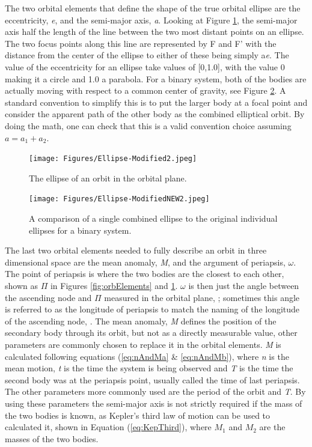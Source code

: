 \documentclass[12pt,preprint]{aastex}
\begin{document}
The two orbital elements that define the shape of the true orbital ellipse are the eccentricity, {\it e}, and the semi-major axis, {\it a}.  Looking at Figure \ref{fig:orbEllipse}, the semi-major axis half the length of the line between the two most distant points on an ellipse.  The two focus points along this line are represented by F and F' with the distance from the center of the ellipse to either of these being simply a{\it e}.  The value of the eccentricity for an ellipse take values of [0,1.0], with the value 0 making it a circle and 1.0 a parabola.  For a binary system, both of the bodies are actually moving with respect to a common center of gravity, see Figure \ref{fig:ellipseComparison}.  A standard convention to simplify this is to put the larger body at a focal point and consider the apparent path of the other body as the combined elliptical orbit.  By doing the math, one can check that this is a valid convention choice assuming  $a= a_1+ a_2$.  


\begin{figure}[h]
\begin{center}
\texttt{[image: Figures/Ellipse-Modified2.jpeg]}
\caption[Orbital Ellipse]{ The ellipse of an orbit in the orbital plane. }
\label{fig:orbEllipse}
\end{center}
\end{figure}

\begin{figure}[h]
\begin{center}
\texttt{[image: Figures/Ellipse-ModifiedNEW2.jpeg]}
\caption[Single vs Dual Orbital Ellipses]{ A comparison of a single combined ellipse to the original individual ellipses for a binary system.}
\label{fig:ellipseComparison}
\end{center}
\end{figure}

The last two orbital elements needed to fully describe an orbit in three dimensional space are the mean anomaly, {\it M}, and the argument of periapsis, $\omega$.  The point of periapsis is where the two bodies are the closest to each other, shown as $\Pi$ in Figures \ref{fig:orbElements} and \ref{fig:orbEllipse}.  $\omega$ is then just the angle between the ascending node and $\Pi$ measured in the orbital plane, \citep{heintz}; sometimes this angle is referred to as the longitude of periapsis to match the naming of the longitude of the ascending node, \citep{hilditch}.  The mean anomaly, {\it M} defines the position of the secondary body through its orbit, but not as a directly measurable value, other parameters are commonly chosen to replace it in the orbital elements.  {\it M} is calculated following equations (\ref{eq:nAndMa} \& \ref{eq:nAndMb}), where {\it n} is the mean motion, {\it t} is the time the system is being observed and {\it T} is the time the second body was at the periapsis point, usually called the time of last periapsis.  The other parameters more commonly used are the period of the orbit and {\it T}.  By using these parameters the semi-major axis is not strictly required if the mass of the two bodies is known, as Kepler's third law of motion can be used to calculated it, shown in Equation (\ref{eq:KepThird}), where $M_1$ and $M_2$ are the masses of the two bodies.
\end{document}
